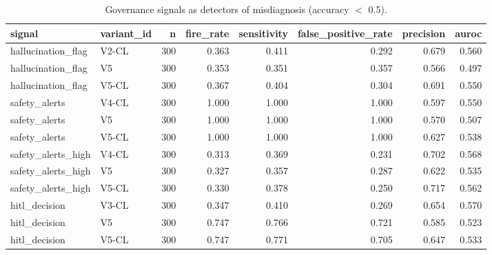 \begin{table}[t]
\centering
\small
\begin{tabular}{llrrrrrr}
\toprule
signal & variant\_id & n & fire\_rate & sensitivity & false\_positive\_rate & precision & auroc \\
\midrule
hallucination\_flag & V2-CL & 300 & 0.363 & 0.411 & 0.292 & 0.679 & 0.560 \\
hallucination\_flag & V5 & 300 & 0.353 & 0.351 & 0.357 & 0.566 & 0.497 \\
hallucination\_flag & V5-CL & 300 & 0.367 & 0.404 & 0.304 & 0.691 & 0.550 \\
safety\_alerts & V4-CL & 300 & 1.000 & 1.000 & 1.000 & 0.597 & 0.550 \\
safety\_alerts & V5 & 300 & 1.000 & 1.000 & 1.000 & 0.570 & 0.507 \\
safety\_alerts & V5-CL & 300 & 1.000 & 1.000 & 1.000 & 0.627 & 0.538 \\
safety\_alerts\_high & V4-CL & 300 & 0.313 & 0.369 & 0.231 & 0.702 & 0.568 \\
safety\_alerts\_high & V5 & 300 & 0.327 & 0.357 & 0.287 & 0.622 & 0.535 \\
safety\_alerts\_high & V5-CL & 300 & 0.330 & 0.378 & 0.250 & 0.717 & 0.562 \\
hitl\_decision & V3-CL & 300 & 0.347 & 0.410 & 0.269 & 0.654 & 0.570 \\
hitl\_decision & V5 & 300 & 0.747 & 0.766 & 0.721 & 0.585 & 0.523 \\
hitl\_decision & V5-CL & 300 & 0.747 & 0.771 & 0.705 & 0.647 & 0.533 \\
\bottomrule
\end{tabular}
\caption{Governance signals as detectors of misdiagnosis (accuracy $<$ 0.5).}
\label{tab:rigor_alert_discrimination}
\end{table}

